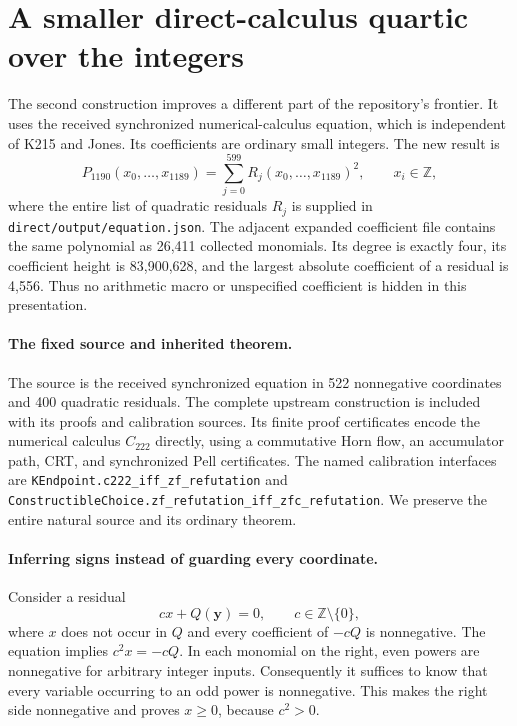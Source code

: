 \section{A smaller direct-calculus quartic over the integers}
\label{sec:direct1190}

The second construction improves a different part of the repository's
frontier. It uses the received synchronized numerical-calculus equation,
which is independent of K215 and Jones. Its coefficients are ordinary
small integers. The new result is
\[
 P_{1190}(x_0,\ldots,x_{1189})
   =\sum_{j=0}^{599}R_j(x_0,\ldots,x_{1189})^2,
 \qquad x_i\in\mathbb Z,
\]
where the entire list of quadratic residuals $R_j$ is supplied in
\texttt{direct/output/equation.json}. The adjacent expanded coefficient
file contains the same polynomial as 26,411 collected monomials.
Its degree is exactly four, its coefficient height is 83,900,628, and the
largest absolute coefficient of a residual is 4,556. Thus no arithmetic
macro or unspecified coefficient is hidden in this presentation.

\paragraph{The fixed source and inherited theorem.}
The source is the received synchronized equation in 522 nonnegative
coordinates and 400 quadratic residuals. The complete upstream construction
is included with its proofs and calibration sources. Its finite proof
certificates encode the numerical calculus $C_{222}$ directly, using a
commutative Horn flow, an accumulator path, CRT, and synchronized Pell
certificates. The named calibration interfaces are
\texttt{KEndpoint.c222\_iff\_zf\_refutation} and
\texttt{ConstructibleChoice.zf\_refutation\_iff\_zfc\_refutation}.
We preserve the entire natural source and its ordinary theorem.

\paragraph{Inferring signs instead of guarding every coordinate.}
Consider a residual
\[
 c x+Q(\boldsymbol y)=0,\qquad c\in\mathbb Z\setminus\{0\},
\]
where $x$ does not occur in $Q$ and every coefficient of $-cQ$ is
nonnegative. The equation implies $c^2x=-cQ$. In each monomial on the
right, even powers are nonnegative for arbitrary integer inputs.
Consequently it suffices to know that every variable occurring to an odd
power is nonnegative. This makes the right side nonnegative and proves
$x\ge0$, because $c^2>0$.

